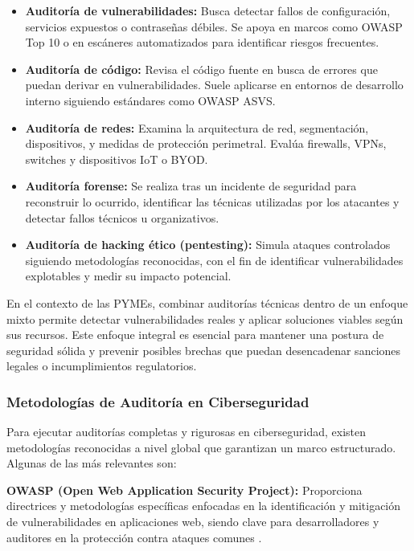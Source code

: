 \documentclass[a4paper, 11pt]{article}
\begin{document}
\begin{itemize}
    \item \textbf{Auditoría de vulnerabilidades:} Busca detectar fallos de configuración, servicios expuestos o contraseñas débiles. Se apoya en marcos como OWASP Top 10 o en escáneres automatizados para identificar riesgos frecuentes.

    \item \textbf{Auditoría de código:} Revisa el código fuente en busca de errores que puedan derivar en vulnerabilidades. Suele aplicarse en entornos de desarrollo interno siguiendo estándares como OWASP ASVS.

    \item \textbf{Auditoría de redes:} Examina la arquitectura de red, segmentación, dispositivos, y medidas de protección perimetral. Evalúa firewalls, VPNs, switches y dispositivos IoT o BYOD.

    \item \textbf{Auditoría forense:} Se realiza tras un incidente de seguridad para reconstruir lo ocurrido, identificar las técnicas utilizadas por los atacantes y detectar fallos técnicos u organizativos.

    \item \textbf{Auditoría de hacking ético (pentesting):} Simula ataques controlados siguiendo metodologías reconocidas, con el fin de identificar vulnerabilidades explotables y medir su impacto potencial.
\end{itemize}

En el contexto de las PYMEs, combinar auditorías técnicas dentro de un enfoque mixto permite detectar vulnerabilidades reales y aplicar soluciones viables según sus recursos. Este enfoque integral es esencial para mantener una postura de seguridad sólida y prevenir posibles brechas que puedan desencadenar sanciones legales o incumplimientos regulatorios.



\subsubsection{Metodologías de Auditoría en Ciberseguridad}

Para ejecutar auditorías completas y rigurosas en ciberseguridad, existen metodologías reconocidas a nivel global que garantizan un marco estructurado. Algunas de las más relevantes son:

\textbf{OWASP (Open Web Application Security Project):} Proporciona directrices y metodologías específicas enfocadas en la identificación y mitigación de vulnerabilidades en aplicaciones web, siendo clave para desarrolladores y auditores en la protección contra ataques comunes \cite{owasp}.
\end{document}
